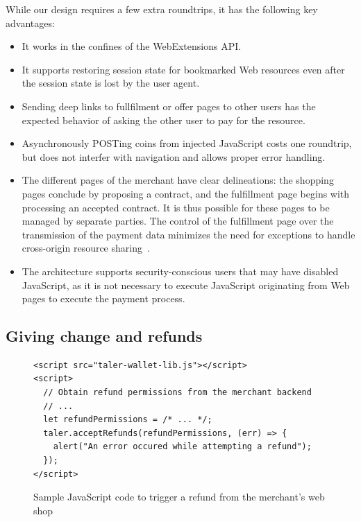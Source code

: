 \documentclass{llncs}
\begin{document}
\noindent
While our design requires a few extra roundtrips,
it has the following key advantages:
\begin{itemize}
  \item It works in the confines of the WebExtensions API.
  \item It supports restoring session state for bookmarked
    Web resources even after the session state is lost by the user agent.
  \item Sending deep links to fullfilment or offer pages to
    other users has the expected behavior
    of asking the other user to pay for the resource.
  \item Asynchronously POSTing coins from injected JavaScript costs
    one roundtrip, but does not interfer with navigation and allows
    proper error handling.
  \item The different pages of the merchant have clear
    delineations: the shopping pages conclude by proposing a contract, and
    the fulfillment page begins with processing an accepted contract.  It is thus
    possible for these pages to be managed by separate parties. The
    control of the fulfillment page over the transmission of the payment
    data minimizes the need for exceptions to handle cross-origin
    resource sharing~\cite{rfc6454,cors}.
  \item The architecture supports security-conscious users that may have
    disabled JavaScript, as it is not necessary to execute JavaScript
    originating from Web pages to execute the payment process.
\end{itemize}


\subsection{Giving change and refunds}

\begin{figure}[b!]
\begin{lstlisting}
<script src="taler-wallet-lib.js"></script>
<script>
  // Obtain refund permissions from the merchant backend
  // ...
  let refundPermissions = /* ... */;
  taler.acceptRefunds(refundPermissions, (err) => {
    alert("An error occured while attempting a refund");
  });
</script>
\end{lstlisting}
 \caption{Sample JavaScript code to trigger a refund from the merchant's web shop}
  \label{listing:refund}
\end{figure}
\end{document}

